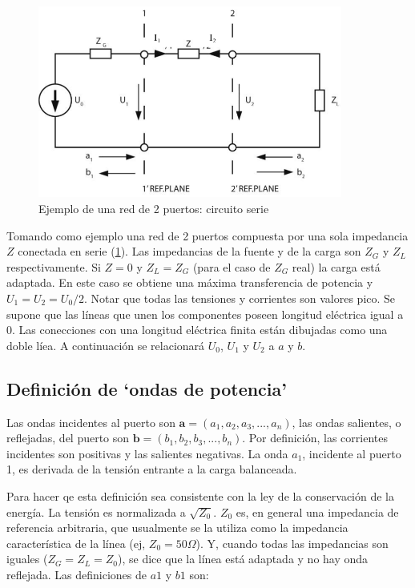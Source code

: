\begin{figure}[H]
 \centering
 \includegraphics[width=10cm]{gfx/sParameters1.png}
 \caption{Ejemplo de una red de 2 puertos: circuito serie}
 \label{fig:esquema_serie}
\end{figure}

Tomando como ejemplo una red de 2 puertos compuesta por una sola impedancia $Z$ conectada en serie (\ref{fig:esquema_serie}).
Las impedancias de la fuente y de la carga son $Z_G$ y $Z_L$ respectivamente. Si $Z=0$ y $Z_L = Z_G$ (para el caso de $Z_G$ real) 
la carga está adaptada. En este caso se obtiene una máxima transferencia de potencia y $U_1 = U_2 = U_0/2$. Notar que todas las
tensiones y corrientes son valores pico. Se supone que las líneas que unen los componentes poseen longitud eléctrica igual a 0. 
Las conecciones con una longitud eléctrica finita están dibujadas como una doble líea. A continuación se relacionará $U_0$, $U_1$ 
y $U_2$ a $a$ y $b$.


\subsection{Definición de \enquote*{ondas de potencia}}

Las ondas incidentes al puerto son $\textbf{a}=(a_1, a_2, a_3, ..., a_n)$, las ondas salientes, o reflejadas, del puerto son  
$\textbf{b}=(b_1, b_2, b_3, ..., b_n)$. Por definición, las corrientes incidentes son positivas y las salientes negativas. La
onda $a_1$, incidente al puerto 1, es derivada de la tensión entrante a la carga balanceada. 

Para hacer qe esta definición sea consistente con la ley de la conservación de la energía. La tensión es normalizada a $\sqrt{Z_0}$. 
$Z_0$ es, en general una impedancia de referencia arbitraria, que usualmente se la utiliza como la impedancia característica de la 
línea (ej, $Z_0 = 50 \Omega$). Y, cuando todas las impedancias son iguales ($Z_G = Z_L = Z_0$), se dice que la línea está adaptada
y no hay onda reflejada. Las definiciones de $a1$ y $b1$ son:

